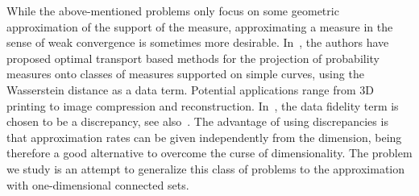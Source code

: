 While the above-mentioned problems only focus on some geometric approximation of the support of the measure, approximating a measure in the sense of weak convergence is sometimes more desirable. In~\cite{lebrat2019optimal,chauffert2017projection}, the authors have proposed optimal transport based methods for the projection of probability measures onto classes of measures supported on simple curves, using the Wasserstein distance as a data term. Potential applications range from 3D printing to image compression and reconstruction.
In~\cite{ehler2021curve}, the data fidelity term is chosen to be a discrepancy, see
also~\cite{neumayer2021optimal}. The advantage of using discrepancies is that approximation rates can be given independently from the dimension, being therefore a good alternative to overcome the curse of dimensionality. The problem we study is an attempt to generalize this class of problems
to the approximation with one-dimensional connected sets.

